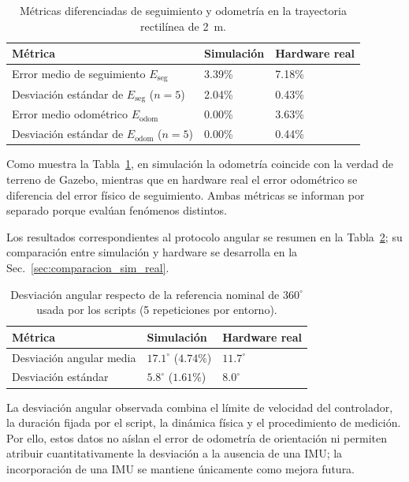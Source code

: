 \begin{table}[H]
\centering
\caption{Métricas diferenciadas de seguimiento y odometría en la trayectoria rectilínea de 2~m.}
\label{tab:resumen_odometria}
\small
\begin{tabular}{p{7.2cm} p{2.2cm} p{2.8cm}}
\toprule
\textbf{Métrica} & \textbf{Simulación} & \textbf{Hardware real} \\
\midrule
Error medio de seguimiento $E_{\mathrm{seg}}$
& 3.39\% & 7.18\% \\
Desviación estándar de $E_{\mathrm{seg}}$ ($n=5$)
& 2.04\% & 0.43\% \\
Error medio odométrico $E_{\mathrm{odom}}$
& 0.00\% & 3.63\% \\
Desviación estándar de $E_{\mathrm{odom}}$ ($n=5$)
& 0.00\% & 0.44\% \\
\bottomrule
\end{tabular}
\end{table}

Como muestra la Tabla~\ref{tab:resumen_odometria}, en simulación la odometría coincide con la verdad de terreno de Gazebo, mientras que en hardware real el error odométrico se diferencia del error físico de seguimiento. Ambas métricas se informan por separado porque evalúan fenómenos distintos.

Los resultados correspondientes al protocolo angular se resumen en la Tabla~\ref{tab:resumen_giro}; su comparación entre simulación y hardware se desarrolla en la Sec.~\ref{sec:comparacion_sim_real}.

\begin{table}[H]
\centering
\caption{Desviación angular respecto de la referencia nominal de $360^\circ$ usada por los scripts (5 repeticiones por entorno).}
\label{tab:resumen_giro}
\small
\begin{tabular}{p{5.0cm} p{3.2cm} p{3.2cm}}
\toprule
\textbf{Métrica} & \textbf{Simulación} & \textbf{Hardware real} \\
\midrule
Desviación angular media & $17.1^\circ$ ($4.74\%$) & $11.7^\circ$ \\
Desviación estándar & $5.8^\circ$ ($1.61\%$) & $8.0^\circ$ \\
\bottomrule
\end{tabular}
\end{table}

La desviación angular observada combina el límite de velocidad del controlador, la duración fijada por el script, la dinámica física y el procedimiento de medición. Por ello, estos datos no aíslan el error de odometría de orientación ni permiten atribuir cuantitativamente la desviación a la ausencia de una IMU; la incorporación de una IMU se mantiene únicamente como mejora futura.

